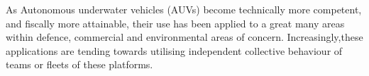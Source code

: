 
As Autonomous underwater vehicles (AUVs) become technically more competent, and fiscally more attainable, their use has been applied to a great many areas within defence, commercial and environmental areas of concern. 
Increasingly,these applications are tending towards utilising  independent collective behaviour of teams or fleets of these platforms.
